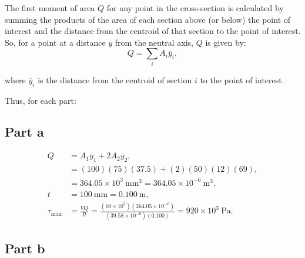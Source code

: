 \documentclass[12pt]{article}
\begin{document}
The first moment of area \( Q \) for any point in the cross-section is calculated by summing the products of the area of each section above (or below) the point of interest and the distance from the centroid of that section to the point of interest. So, for a point at a distance \( y \) from the neutral axis, \( Q \) is given by:
\[ Q = \sum_{i} A_i \bar{y}_i, \]

where \( \bar{y}_i \) is the distance from the centroid of section \( i \) to the point of interest.

\begin{figure}[!ht]
    \centering
    \caption{}
    \label{fig:enter-label}
\end{figure}


Thus, for each part:

\subsection*{Part a}

\[
\begin{aligned}
Q & =A_1 \bar{y}_1+2 A_2 \bar{y}_2, \\
& =(100)(75)(37.5)+(2)(50)(12)(69), \\
& =364.05 \times 10^3 \mathrm{~mm}^3=364.05 \times 10^{-6} \mathrm{~m}^3, \\
t & =100 \mathrm{~mm}=0.100 \mathrm{~m}, \\
\tau_{\max } & =\frac{V Q}{I t}=\frac{\left(10 \times 10^3\right)\left(364.05 \times 10^{-6}\right)}{\left(39.58 \times 10^{-6}\right)(0.100)}=920 \times 10^3 \mathrm{~Pa}.
\end{aligned}
\]
\AnswerTag

\subsection*{Part b}
\end{document}
